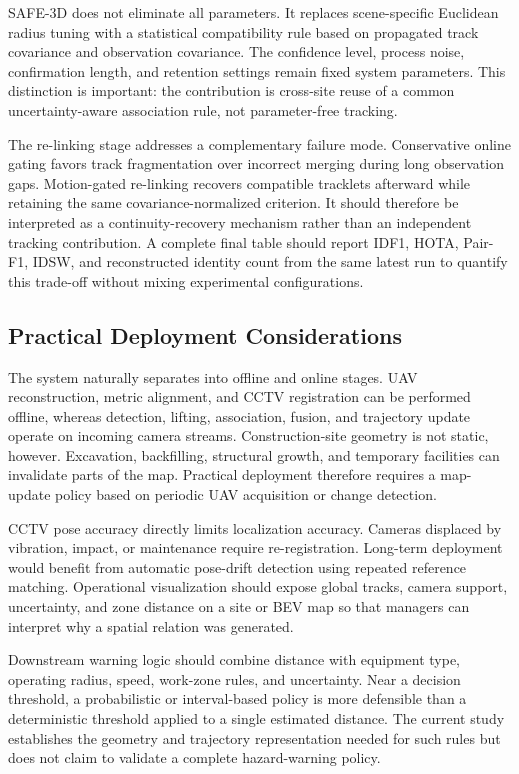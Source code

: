 SAFE-3D does not eliminate all parameters. It replaces scene-specific Euclidean radius tuning with a statistical compatibility rule based on propagated track covariance and observation covariance. The confidence level, process noise, confirmation length, and retention settings remain fixed system parameters. This distinction is important: the contribution is cross-site reuse of a common uncertainty-aware association rule, not parameter-free tracking.

The re-linking stage addresses a complementary failure mode. Conservative online gating favors track fragmentation over incorrect merging during long observation gaps. Motion-gated re-linking recovers compatible tracklets afterward while retaining the same covariance-normalized criterion. It should therefore be interpreted as a continuity-recovery mechanism rather than an independent tracking contribution. A complete final table should report IDF1, HOTA, Pair-F1, IDSW, and reconstructed identity count from the same latest run to quantify this trade-off without mixing experimental configurations.

\subsection{Practical Deployment Considerations}
The system naturally separates into offline and online stages. UAV reconstruction, metric alignment, and CCTV registration can be performed offline, whereas detection, lifting, association, fusion, and trajectory update operate on incoming camera streams. Construction-site geometry is not static, however. Excavation, backfilling, structural growth, and temporary facilities can invalidate parts of the map. Practical deployment therefore requires a map-update policy based on periodic UAV acquisition or change detection.

CCTV pose accuracy directly limits localization accuracy. Cameras displaced by vibration, impact, or maintenance require re-registration. Long-term deployment would benefit from automatic pose-drift detection using repeated reference matching. Operational visualization should expose global tracks, camera support, uncertainty, and zone distance on a site or BEV map so that managers can interpret why a spatial relation was generated.

Downstream warning logic should combine distance with equipment type, operating radius, speed, work-zone rules, and uncertainty. Near a decision threshold, a probabilistic or interval-based policy is more defensible than a deterministic threshold applied to a single estimated distance. The current study establishes the geometry and trajectory representation needed for such rules but does not claim to validate a complete hazard-warning policy.

